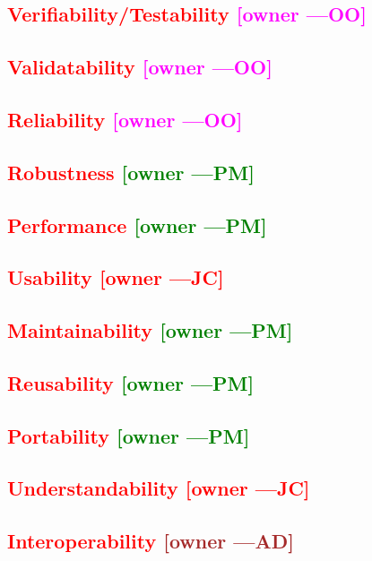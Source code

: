 \documentclass[letterpaper,cleveref]{lipics-v2019}
\newcommand{\authornote}[3]{\textcolor{#1}{[#3 ---#2]}}
\newcommand{\authornote}[3]{}
\newcommand{\jc}[1]{\authornote{red}{JC}{#1}} %
\newcommand{\oo}[1]{\authornote{magenta}{OO}{#1}} %
\newcommand{\pmi}[1]{\authornote{green}{PM}{#1}} %
\newcommand{\ad}[1]{\authornote{brown}{AD}{#1}} %
\newcommand{\notdone}[1]{\textcolor{red}{#1}}
\theoremstyle{definition}
\begin{document}
\subsection{\notdone{Verifiability/Testability} \oo{owner}}

\subsection{\notdone{Validatability} \oo{owner}}

\subsection{\notdone{Reliability} \oo{owner}}

\subsection{\notdone{Robustness} \pmi{owner}}

\subsection{\notdone{Performance} \pmi{owner}}

\subsection{\notdone{Usability} \jc{owner}} 

\subsection{\notdone{Maintainability} \pmi{owner}}

\subsection{\notdone{Reusability} \pmi{owner}}

\subsection{\notdone{Portability} \pmi{owner}}

\subsection{\notdone{Understandability} \jc{owner}}

\subsection{\notdone{Interoperability} \ad{owner}}
\end{document}
